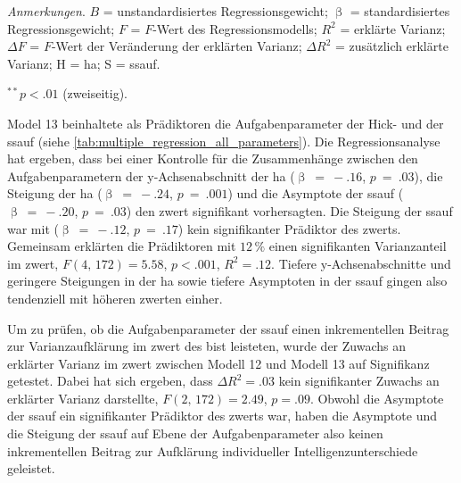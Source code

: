 \documentclass[11pt, twoside, a4paper]{book}		%
\begin{document}
\begin{table}[t]
\begin{adjustbox}{width=1\textwidth}
\begin{threeparttable}
		\begin{tablenotes}[flushleft]
			\footnotesize				%
			\setlength{}	%
			\item \textit{Anmerkungen}. $B$ = unstandardisiertes Regressionsgewicht; $\upbeta$ = standardisiertes Regressionsgewicht; $F$ = $F$-Wert des Regressionsmodells; $R^2$ = erklärte Varianz; $\Delta F$ = $F$-Wert der Veränderung der erklärten Varianz; $\Delta R^2$ = zusätzlich erklärte Varianz; H = \gls{ha}; S = \gls{ssauf}.
			\item {$^{**}$}$p<.01$ (zweiseitig).
		\end{tablenotes}
	\end{threeparttable}
	\end{adjustbox}
\end{table}

Model 13 beinhaltete als Prädiktoren die Aufgabenparameter der Hick- und der \gls{ssauf} (siehe \autoref{tab:multiple_regression_all_parameters}). 
Die Regressionsanalyse hat ergeben, dass bei einer Kontrolle für die Zusammenhänge zwischen den Aufgabenparametern der y-Achsenabschnitt der \gls{ha}  ($\upbeta~=~-.16$, $p~=~.03$), die Steigung der \gls{ha} ($\upbeta~=~-.24$, $p~=~.001$) und die Asymptote der \gls{ssauf} ($\upbeta~=~-.20$, $p~=~.03$) den \gls{zwert} signifikant vorhersagten. Die Steigung der \gls{ssauf} war mit ($\upbeta~=~-.12$, $p~=~.17$) kein signifikanter Prädiktor des \gls{zwert}s.
Gemeinsam erklärten die Prädiktoren mit $12\,\%$ einen signifikanten Varianzanteil im \gls{zwert}, $F(4,\,172)=5.58$, $p<.001$, $R^2=.12$. 
Tiefere y-Achsenabschnitte und geringere Steigungen in der \gls{ha} sowie tiefere Asymptoten in der \gls{ssauf} gingen also tendenziell mit höheren \gls{zwert}en einher.

Um zu prüfen, ob die Aufgabenparameter der \gls{ssauf} einen inkrementellen Beitrag zur Varianzaufklärung im \gls{zwert} des \gls{bist} leisteten, wurde der Zuwachs an erklärter Varianz im \gls{zwert} zwischen Modell 12 und Modell 13 auf Signifikanz getestet. 
Dabei hat sich ergeben, dass $\Delta R^2=.03$ kein signifikanter Zuwachs an erklärter Varianz darstellte, $F(2,\,172)=2.49$, $p=.09$.
Obwohl die Asymptote der \gls{ssauf} ein signifikanter Prädiktor des \gls{zwert}s war, haben die Asymptote und die Steigung der \gls{ssauf} auf Ebene der Aufgabenparameter also keinen inkrementellen Beitrag zur Aufklärung individueller Intelligenzunterschiede geleistet.
\end{document}
